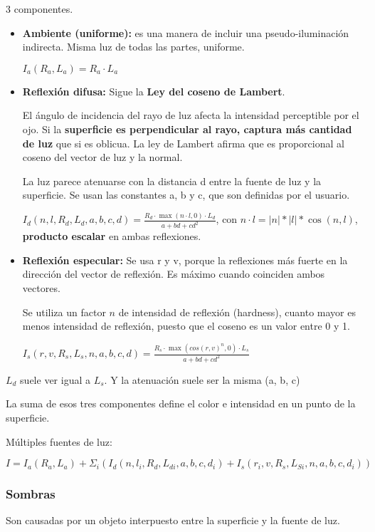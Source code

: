 3 componentes. 
\begin{itemize}
	\item \textbf{Ambiente (uniforme):} es una manera de incluir una pseudo-iluminación indirecta. Misma luz de todas las partes, uniforme.
	      
	      $I_a(R_a, L_a)=R_a \cdot L_a$
	\item \textbf{Reflexión difusa:} Sigue la \textbf{Ley del coseno de Lambert}.
	      
	      El ángulo de incidencia del rayo de luz afecta la intensidad perceptible por el ojo. Si la \textbf{superficie es perpendicular al rayo, captura más cantidad de luz} que si es oblicua. La ley de Lambert afirma que es proporcional al coseno del vector de luz y la normal. 
	      
	      La luz parece atenuarse con la distancia d entre la fuente de luz y la superficie. Se usan las constantes a, b y c, que son definidas por el usuario.
	      
	      $I_d(n, l, R_d, L_d, a, b, c, d)= \frac {R_d \cdot \max (n\cdot l,0) \cdot L_d}{a+bd+cd^2}$, con $n \cdot l = |n|*|l|*\cos(n,l)$, \textbf{producto escalar} en ambas reflexiones.
	\item \textbf{Reflexión especular:} Se usa r y v, porque la reflexiones más fuerte en la dirección del vector de reflexión. Es máximo cuando coinciden ambos vectores.
	      
	      Se utiliza un factor $n$ de intensidad de reflexión (hardness), cuanto mayor es menos intensidad de reflexión, puesto que el coseno es un valor entre 0 y 1.
	      
	      $I_s(r,v, R_s, L_s, n, a, b, c, d)= \frac {R_s \cdot \max (cos(r,v)^n,0) \cdot L_s}{a+bd+cd^2}$
\end{itemize}

$L_d$ suele ver igual a $L_s$. Y la atenuación suele ser la misma (a, b, c)

La suma de esos tres componentes define el color e intensidad en un punto de la superficie.

Múltiples fuentes de luz: 

$$I=I_a(R_a,L_a)+\Sigma_i (I_d(n, l_i, R_d, L_{di}, a, b, c, d_i)+I_s(r_i,v, R_s, L_{Si}, n, a, b, c, d_i))$$
\pagebreak

\subsubsection{Sombras}
Son causadas por un objeto interpuesto entre la superficie y la fuente de luz.

